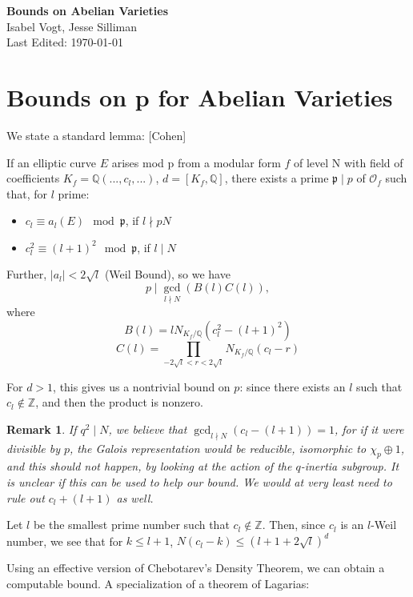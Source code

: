 \documentclass[12pt]{article}
\newtheorem{rem}[thm]{Remark}
\begin{document}
\begin{center}
{\bf \large{Bounds on Abelian Varieties}} \\
\smallskip
Isabel Vogt, Jesse Silliman\\
Last Edited: \today \\
\end{center}

\section{Bounds on p for Abelian Varieties}
We state a standard lemma: [Cohen]

If an elliptic curve $E$ arises mod p from a modular form $f$ of level N with field of coefficients $K_f = \mathbb{Q}(...,c_l,...)$, $d = [K_f,\mathbb{Q}]$, there exists a prime $\mathfrak{p} \mid p$ of $\mathcal{O}_f$ such that, for $l$ prime:
\begin{itemize}
\item $c_l \equiv a_l(E) \mod \mathfrak{p}$, if $l \nmid pN$
\item $c_l^2 \equiv (l+1)^2 \mod \mathfrak{p}$, if $l \mid N$
\end{itemize}

Further, $|a_l| < 2\sqrt{l}$ (Weil Bound), so we have
\[p \mid \gcd_{l \nmid N}(B(l)C(l)), \] where
\[B(l) = lN_{K_f / \mathbb{Q}}(c_l^2-(l+1)^2) \]
\[C(l) = \prod_{-2\sqrt{l} < r < 2\sqrt{l}}{N_{K_f / \mathbb{Q}}}(c_l - r)\]


For $d > 1$, this gives us a nontrivial bound on $p$: since there exists an $l$ such that $c_l \notin \mathbb{Z}$, and then the product is nonzero.

\begin{rem}
If $q^2 \mid N$, we believe that $\gcd_{l \nmid N}(c_l - (l+1)) = 1$, for if it were divisible by $p$, the Galois representation would be reducible, isomorphic to $\chi_p \oplus 1$, and this should not happen, by looking at the action of the $q$-inertia subgroup. It is unclear if this can be used to help our bound. We would at very least need to rule out $c_l + (l+1)$ as well.
\end{rem}

Let $l$ be the smallest prime number such that $c_l \notin \mathbb{Z}$. Then, since $c_l$ is an $l$-Weil number, we see that for $k \leq l+1$, $N(c_l - k) \leq (l+1 + 2\sqrt{l})^d$

Using an effective version of Chebotarev's Density Theorem, we can obtain a computable bound. A specialization of a theorem of Lagarias:
\end{document}

